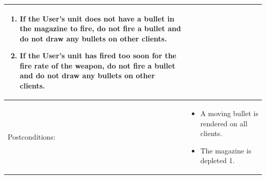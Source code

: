\documentclass[12pt]{article}
\begin{document}
\begin{tabularx}{\textwidth}{|l|X|}
\begin{enumerate}
\item If the User's unit does not have a bullet in the magazine to fire, do not fire a bullet and do not draw any bullets on other clients.
\item If the User's unit has fired too soon for the fire rate of the weapon, do not fire a bullet and do not draw any bullets on other clients.
\end{enumerate} \\ \hline
Postconditions: & \begin{itemize}
\item A moving bullet is rendered on all clients.
\item The magazine is depleted 1.
\end{itemize} \\ \hline
\end{tabularx}
\end{document}
